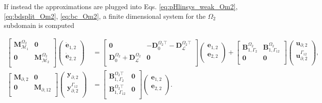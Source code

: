 If instead the approximations are plugged into  Eqs. \ref{eq:pHlinsys_weak_Om2}, \ref{eq:bdsplit_Om2}, \ref{eq:bc_Om2}, a finite dimensional system for the $\Omega_2$ subdomain is computed

\begin{equation}\label{eq:pHlinsys_findim_Om2}
\begin{aligned}
\begin{bmatrix}
\mathbf{M}_{\mathcal{M}_1}^{\Omega_2} & \mathbf{0} \\
\mathbf{0} & \mathbf{M}_{\mathcal{M}_2}^{\Omega_2} \\
\end{bmatrix}
\begin{pmatrix}
\dot{\mathbf{e}}_{1, 2} \\
\dot{\mathbf{e}}_{2, 2} \\
\end{pmatrix}
&= \begin{bmatrix}
\mathbf{0} & -\mathbf{D}_{0}^{\Omega_2 \top} - \mathbf{D}_{\mathcal{L}}^{\Omega_2 \top} \\
\mathbf{D}_{0}^{\Omega_2} + \mathbf{D}_{\mathcal{L}}^{\Omega_2} & \mathbf{0} \\
\end{bmatrix} 
\begin{pmatrix}
\mathbf{e}_{1, 2} \\
\mathbf{e}_{2, 2} \\
\end{pmatrix} + 
\begin{bmatrix}
\mathbf{B}_{1, \Gamma_2}^{\Omega_2} & \mathbf{B}_{1, \Gamma_{12}}^{\Omega_2}\\
\mathbf{0} & \mathbf{0}\\
\end{bmatrix}
\begin{pmatrix}
\mathbf{u}_{\partial, 2} \\
\mathbf{u}_{\partial, 2}^{\Gamma_{12}} \\
\end{pmatrix}, \\
\begin{bmatrix}
\mathbf{M}_{\partial, 2} & \mathbf{0}  \\
\mathbf{0} & \mathbf{M}_{\partial, 12} \\
\end{bmatrix}
\begin{pmatrix}
\mathbf{y}_{\partial, 2} \\
\mathbf{y}_{\partial, 2}^{\Gamma_{12}} \\
\end{pmatrix}
&= 
\begin{bmatrix}
\mathbf{B}_{1, \Gamma_2}^{\Omega_2 \top} & \mathbf{0} \\
\mathbf{B}_{1, \Gamma_{12}}^{\Omega_2 \top} & \mathbf{0} \\
\end{bmatrix}\begin{pmatrix}
\mathbf{e}_{1, 2} \\
\mathbf{e}_{2, 2} \\
\end{pmatrix}.
\end{aligned}
\end{equation}

